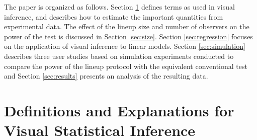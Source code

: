 \documentclass[12pt]{article}
\newcommand{\blue}[1]{{\color{blue} #1}} %
\begin{document}





The paper is organized as follows. Section \ref{sec:visual_test} defines terms as used in visual inference, and describes how to estimate the important quantities from experimental data. The effect of the lineup size and number of observers on the power of the test is discussed in Section \ref{sec:size}. Section \ref{sec:regression} focuses on the application of  visual inference to linear models.  Section \ref{sec:simulation} describes  three  user studies based on simulation experiments conducted to compare the power of the lineup protocol with the equivalent conventional test and  Section \ref{sec:results} presents an analysis of the resulting data. %


\section{Definitions and Explanations for Visual Statistical Inference} \label{sec:visual_test} 
\end{document}
